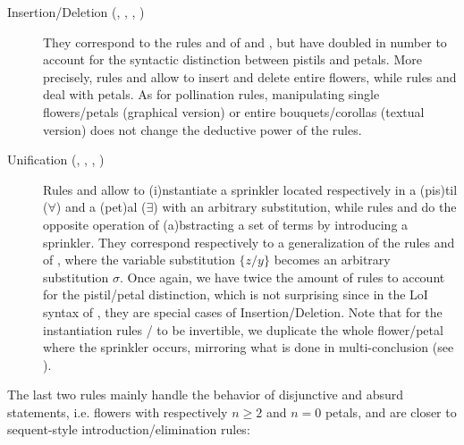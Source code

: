 \begin{description}
  \item[Insertion/Deletion (, , , )]
    They correspond to the rules  and  of  and
    , but have doubled in number to account for the syntactic
    distinction between pistils and petals. More precisely, rules  and
     allow to insert and delete entire flowers, while rules 
    and  deal with petals. As for pollination rules, manipulating
    single flowers/petals (graphical version) or entire bouquets/corollas
    (textual version) does not change the deductive power of the rules.
    
  \item[Unification (, , , )]
    Rules  and  allow to \textsf{(i)}nstantiate a sprinkler
    located respectively in a \textsf{(pis)}til ($\forall$) and a
    \textsf{(pet)}al ($\exists$) with an arbitrary substitution, while rules
     and  do the opposite operation of
    \textsf{(a)}bstracting a set of terms by introducing a sprinkler. They
    correspond respectively to a generalization of the rules  and
     of , where the variable substitution $\{z/y\}$
    becomes an arbitrary substitution $\sigma$. Once again, we have twice the
    amount of rules to account for the pistil/petal distinction, which is not
    surprising since in the LoI syntax of , they are special cases of
    Insertion/Deletion. Note that for the instantiation rules
    / to be invertible, we duplicate the whole flower/petal
    where the sprinkler occurs, mirroring what is done in multi-conclusion
     (see ).
\end{description}

The last two rules mainly handle the behavior of disjunctive and absurd
statements, i.e. flowers with respectively $n \geq 2$ and $n = 0$ petals, and
are closer to sequent-style introduction/elimination rules:

